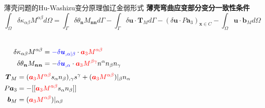 \begin{frame}{薄壳问题的Hu-Washizu变分原理伽辽金弱形式}
    \textbf{薄壳弯曲应变部分变分一致性条件}
    {\footnotesize
    \begin{equation*}
        \int_\Omega \delta \kappa_{\alpha\beta} M^{\alpha\beta}d\Omega = \int_\Gamma \delta \theta_{\boldsymbol n} M_{\boldsymbol n \boldsymbol n}d\Gamma - \int_\Gamma \delta \boldsymbol u \cdot \boldsymbol T_M d\Gamma - (\delta \boldsymbol u \cdot P \boldsymbol a_3)_{\boldsymbol x \in C} - \int_\Omega \boldsymbol u \cdot \boldsymbol b_M d\Omega
    \end{equation*}}

    \centering
    \begin{tcolorbox}[colframe=MediumBlue, colback=white,width=0.9\textwidth]
    \footnotesize\vspace{-10pt}
    \begin{columns}
        \begin{align*}
            \delta \kappa_{\alpha\beta} M^{\alpha\beta}
            &={\color{blue}-\delta\boldsymbol u_{,\alpha\vert\beta}}\cdot {\color{red}\boldsymbol a_3 M^{\alpha\beta}} \\
            \delta \theta_{\boldsymbol n} M_{\boldsymbol n \boldsymbol n}&=-{\color{blue}\delta \boldsymbol u_{,\alpha}}\cdot {\color{red}\boldsymbol a_3 M^{\beta\gamma}} n^\alpha n_\beta n_\gamma 
        \end{align*}
        \begin{align*}
            \boldsymbol T_M &= ({\color{red}\boldsymbol a_3 M^{\alpha\beta}}s_\alpha n_\beta)_{,\gamma} s^\gamma
            + ({\color{red}\boldsymbol a_3 M^{\alpha\beta}})\vert_\beta n_\alpha \\
            P\boldsymbol a_3 &= -[[{\color{red}\boldsymbol a_3 M^{\alpha\beta}}s_\alpha n_\beta]] \\
            \boldsymbol b_M &= ({\color{red}\boldsymbol a_3 M^{\alpha\beta}})\vert_{\alpha\beta}
        \end{align*}
    \end{columns}
    \end{tcolorbox}

    \tikz{\node[
        single arrow, draw,
        fill=MediumBlue,
        minimum width=0.1cm,
        minimum height=0.7cm,
        single arrow head extend=0.2cm,
        shape border rotate=270,
    ] {};}


\end{frame}
